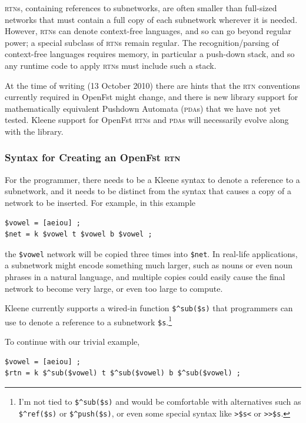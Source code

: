 \documentclass[letterpaper,12pt]{article}
\newcommand{\acro}{\textsc}
\begin{document}
\acro{rtn}s, containing references to subnetworks, are often smaller than
full-sized networks that must contain a full copy of each subnetwork
wherever it is needed.  However, \acro{rtn}s can denote context-free
languages, and so can go beyond regular power; a special subclass of
\acro{rtn}s remain regular.  The recognition/parsing of context-free
languages requires memory, in particular a push-down stack, and so any
runtime code to apply \acro{rtn}s must include such a stack.

At the time of writing (13 October 2010) there are hints that the
\acro{rtn} conventions currently required in OpenFst might change, and
there is new library support for mathematically equivalent Pushdown
Automata (\acro{pda}s) that we have not yet tested.  Kleene support for
OpenFst \acro{rtn}s and \acro{pda}s will necessarily evolve along with
the library.

\subsubsection{Syntax for Creating an OpenFst \acro{rtn}}

For the programmer, there needs to be a Kleene syntax to denote a
reference to a subnetwork, and it needs to be distinct from the syntax
that causes a copy of a network to be inserted.  For example, in this
example

\begin{Verbatim}[fontsize=\small]
$vowel = [aeiou] ;
$net = k $vowel t $vowel b $vowel ;
\end{Verbatim}

\noindent
the \verb!$vowel! network will be copied three times into \verb!$net!.
In real-life applications, a subnetwork might encode something much
larger, such as nouns or even noun phrases in a natural language, and
multiple copies could easily cause the final network to become very
large, or even too large to compute.

Kleene currently supports a wired-in function \verb!$^sub($s)! that
programmers can use to denote a reference to a subnetwork \verb!$s!.\footnote{I'm
not tied to \verb!$^sub($s)! and would be comfortable with alternatives such
as \verb!$^ref($s)! or \verb!$^push($s)!, or even some special syntax like
\verb!>$s<! or \verb!>>$s!.} 

To continue with our trivial example, 

\begin{Verbatim}[fontsize=\small]
$vowel = [aeiou] ;
$rtn = k $^sub($vowel) t $^sub($vowel) b $^sub($vowel) ;
\end{Verbatim}
\end{document}
